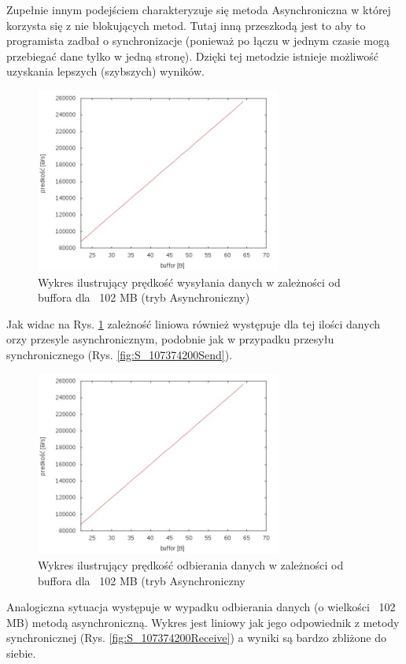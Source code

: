 \documentclass{BscUS}
\begin{document}
Zupełnie innym podejściem charakteryzuje się metoda Asynchroniczna w której korzysta się z nie blokujących metod. Tutaj inną przeszkodą jest to aby to programista zadbał o synchronizacje (ponieważ po łączu w jednym czasie mogą przebiegać dane tylko w jedną stronę). Dzięki tej metodzie istnieje możliwość uzyskania lepszych (szybszych) wyników.
\begin{figure}[H]
{
\centering
\includegraphics[width=0.72\textwidth]{./img/A_107374200Send}
\caption{Wykres ilustrujący prędkość wysyłania danych w zależności od buffora dla ~102 MB (tryb Asynchroniczny)}
\label{fig:A_107374200Send}
}

\end{figure}

Jak widac na Rys. \ref{fig:A_107374200Send} zależność liniowa również występuje dla tej ilości danych orzy przesyle asynchronicznym, podobnie jak w przypadku przesyłu synchronicznego (Rys. \ref{fig:S_107374200Send}).


\begin{figure}[H]
{
\centering
\includegraphics[width=0.72\textwidth]{./img/A_107374200Receive}
\caption{Wykres ilustrujący prędkość odbierania danych w zależności od buffora dla ~102 MB (tryb Asynchroniczny}
\label{fig:A_107374200Receive}
}
\end{figure}
Analogiczna sytuacja występuje w wypadku odbierania danych (o wielkości ~102 MB) metodą asynchroniczną. Wykres jest liniowy jak jego odpowiednik z metody synchronicznej (Rys. \ref{fig:S_107374200Receive}) a wyniki są bardzo zbliżone do siebie.
\end{document}
